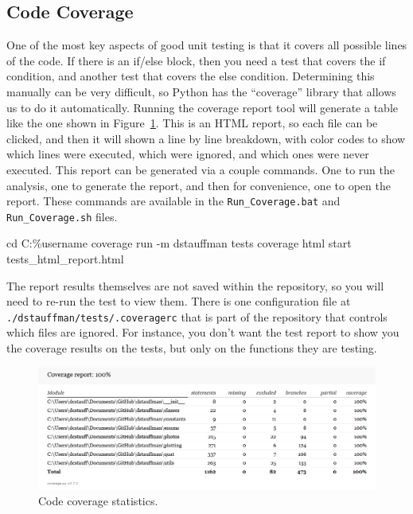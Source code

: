 \documentclass[12pt]{article}
\begin{document}
\subsection{Code Coverage}\label{h2:Code_coverage}
One of the most key aspects of good unit testing is that it covers all possible lines of the code.  If there is an if/else block, then you need a test that covers the if condition, and another test that covers the else condition.  Determining this manually can be very difficult, so Python has the ``coverage'' library that allows us to do it automatically.  Running the coverage report tool will generate a table like the one shown in Figure~\ref{fig:code_coverage}.  This is an HTML report, so each file can be clicked, and then it will shown a line by line breakdown, with color codes to show which lines were executed, which were ignored, and which ones were never executed.  This report can be generated via a couple commands.  One to run the analysis, one to generate the report, and then for convenience, one to open the report.  These commands are available in the \texttt{Run\_Coverage.bat} and \texttt{Run\_Coverage.sh} files.
\begin{PlainText}
cd C:\Users\%username%
coverage run -m dstauffman tests
coverage html
start tests\coverage_html_report\index.html
\end{PlainText}

The report results themselves are not saved within the repository, so you will need to re-run the test to view them.  There is one configuration file at \texttt{./dstauffman/tests/.coveragerc} that is part of the repository that controls which files are ignored.  For instance, you don't want the test report to show you the coverage results on the tests, but only on the functions they are testing.

\begin{figure}[H]
    \centering
    \includegraphics[width=\textwidth]{Coverage.png}
    \caption{Code coverage statistics.}
    \label{fig:code_coverage}
\end{figure}
\end{document}
